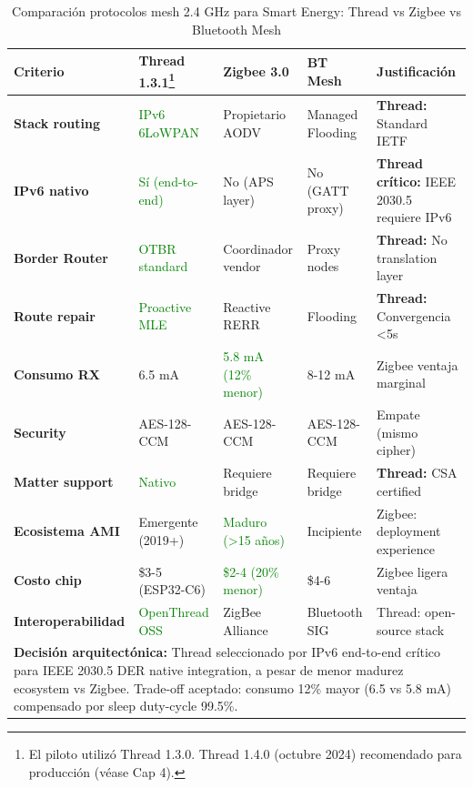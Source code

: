 \begin{table}[h]
\centering
\small
\caption{Comparación protocolos mesh 2.4 GHz para Smart Energy: Thread vs Zigbee vs Bluetooth Mesh}
\label{tab:mesh-protocols-detailed}
\begin{tabular}{|p{2.8cm}|p{2.6cm}|p{2.6cm}|p{2.6cm}|p{2.8cm}|}
\hline
\rowcolor{gray!20}
\textbf{Criterio} & \textbf{Thread 1.3.1}\footnote{El piloto utilizó Thread 1.3.0. Thread 1.4.0 (octubre 2024) recomendado para producción (véase Cap 4).} & \textbf{Zigbee 3.0} & \textbf{BT Mesh} & \textbf{Justificación} \\
\hline
\textbf{Stack routing} & \textcolor{green}{IPv6 6LoWPAN} & Propietario AODV & Managed Flooding & \textbf{Thread:} Standard IETF \\
\hline
\textbf{IPv6 nativo} & \textcolor{green}{Sí (end-to-end)} & No (APS layer) & No (GATT proxy) & \textbf{Thread crítico:} IEEE 2030.5 requiere IPv6 \\
\hline
\textbf{Border Router} & \textcolor{green}{OTBR standard} & Coordinador vendor & Proxy nodes & \textbf{Thread:} No translation layer \\
\hline
\textbf{Route repair} & \textcolor{green}{Proactive MLE} & Reactive RERR & Flooding & \textbf{Thread:} Convergencia <5s \\
\hline
\textbf{Consumo RX} & 6.5 mA & \textcolor{green}{5.8 mA (12\% menor)} & 8-12 mA & Zigbee ventaja marginal \\
\hline
\textbf{Security} & AES-128-CCM & AES-128-CCM & AES-128-CCM & Empate (mismo cipher) \\
\hline
\textbf{Matter support} & \textcolor{green}{Nativo} & Requiere bridge & Requiere bridge & \textbf{Thread:} CSA certified \\
\hline
\textbf{Ecosistema AMI} & Emergente (2019+) & \textcolor{green}{Maduro (>15 años)} & Incipiente & Zigbee: deployment experience \\
\hline
\textbf{Costo chip} & \$3-5 (ESP32-C6) & \textcolor{green}{\$2-4 (20\% menor)} & \$4-6 & Zigbee ligera ventaja \\
\hline
\textbf{Interoperabilidad} & \textcolor{green}{OpenThread OSS} & ZigBee Alliance & Bluetooth SIG & Thread: open-source stack \\
\hline
\multicolumn{5}{|p{15.2cm}|}{\textbf{Decisión arquitectónica:} Thread seleccionado por IPv6 end-to-end crítico para IEEE 2030.5 DER native integration, a pesar de menor madurez ecosystem vs Zigbee. Trade-off aceptado: consumo 12\% mayor (6.5 vs 5.8 mA) compensado por sleep duty-cycle 99.5\%.} \\
\hline
\end{tabular}
\end{table}

